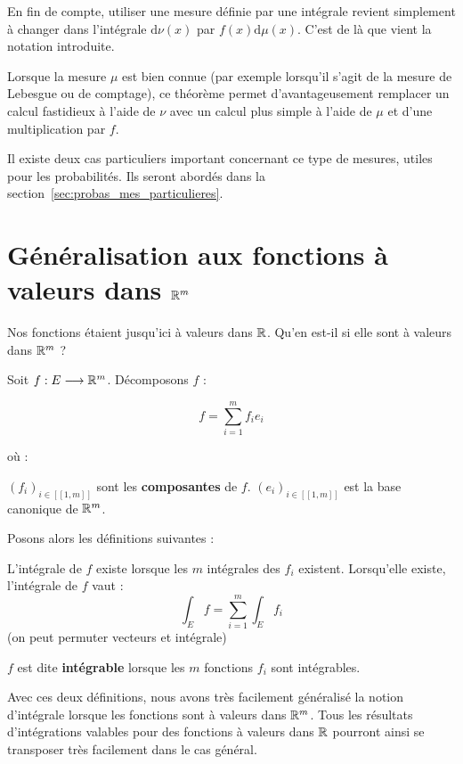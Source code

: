 \documentclass[../integ-proba.tex]{subfiles}
\begin{document}
    \begin{rem}
        En fin de compte, utiliser une mesure définie par une intégrale revient simplement à changer dans l'intégrale $\text{d}\nu(x)$ par $f(x) \text{d}\mu(x)$.
        C'est de là que vient la notation introduite.

        Lorsque la mesure $\mu$ est bien connue (par exemple lorsqu'il s'agit de la mesure de Lebesgue ou de comptage), ce théorème permet d'avantageusement remplacer un calcul fastidieux à l'aide de $\nu$ avec un calcul plus simple à l'aide de $\mu$ et d'une multiplication par $f$.
    \end{rem}

  Il existe deux cas particuliers important concernant ce type de mesures, utiles pour les probabilités.
  Ils seront abordés dans la section~\ref{sec:probas_mes_particulieres}.

  \section{Généralisation aux fonctions à valeurs dans $\mathbb{R}^m$}

  Nos fonctions étaient jusqu'ici à valeurs dans $\mathbb{R}$.
  Qu'en est-il si elle sont à valeurs dans $\mathbb{R}^m$ ?

  Soit $f:E\longrightarrow \mathbb{R}^m$.
  Décomposons $f$ :

  \begin{displaymath}
    f = \sum_{i=1}^{m}f_i e_i
  \end{displaymath}

  où :
  \begin{itemize}
    \itemb $\left(f_i\right)_{i\in[\![1,m]\!]}$ sont les \textbf{composantes} de $f$.
    \itemb $\left(e_i\right)_{i\in[\![1,m]\!]}$ est la base canonique de $\mathbb{R}^m$.
  \end{itemize}

  Posons alors les définitions suivantes :

  \begin{defi}
    L'intégrale de $f$ existe lorsque les $m$ intégrales des $f_i$ existent.
    Lorsqu'elle existe, l'intégrale de $f$ vaut :
    \begin{displaymath}
      \int_E f = \sum_{i=1}^{m}\int_E f_i
    \end{displaymath}
    (on peut permuter vecteurs et intégrale)
  \end{defi}

  \begin{defi}
    $f$ est dite \textbf{intégrable} lorsque les $m$ fonctions $f_i$ sont intégrables.
  \end{defi}

  Avec ces deux définitions, nous avons très facilement généralisé la notion d'intégrale lorsque les fonctions sont à valeurs dans $\mathbb{R}^m$.
  Tous les résultats d'intégrations valables pour des fonctions à valeurs dans $\mathbb{R}$ pourront ainsi se transposer très facilement dans le cas général.
\end{document}
